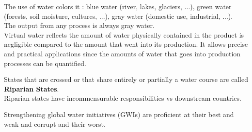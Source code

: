\documentclass[../main.tex]{subfiles}
\begin{document}
The use of water colors it : blue water (river, lakes, glaciers, ...), green water (forests, soil moisture, cultures, ...), gray water (domestic use, industrial, ...).\\
\warning The output from any process is always gray water. \\

Virtual water reflects the amount of water physically contained in the product is negligible compared to the amount that went into its production. It allows precise and practical applications since the amounts of water that goes into production processes can be quantified.\\

\begin{theorem}
    States that are crossed or that share entirely or partially a water course are called \textbf{Riparian States}.\\
    Riparian states have incommensurable responsibilities vs downstream countries. 
\end{theorem}

Strengthening global water initiatives (GWIs) are proficient at their best and weak and corrupt and their worst. 
\end{document}

